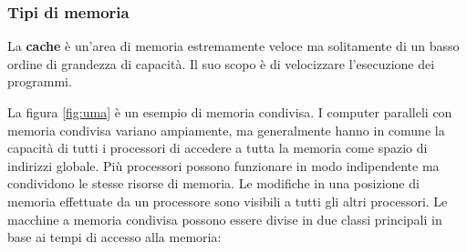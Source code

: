 \subsubsection{Tipi di memoria}
La \textbf{cache} è un'area di memoria estremamente veloce ma solitamente di un basso ordine di grandezza di capacità. Il suo scopo è di velocizzare l'esecuzione dei programmi.

La figura \ref{fig:uma} è un esempio di memoria condivisa. I computer paralleli con memoria condivisa variano ampiamente, ma generalmente hanno in comune la capacità di tutti i processori di accedere a tutta la memoria come spazio di indirizzi globale. Più processori possono funzionare in modo indipendente ma condividono le stesse risorse di memoria. Le modifiche in una posizione di memoria effettuate da un processore sono visibili a tutti gli altri processori. Le macchine a memoria condivisa possono essere divise in due classi principali in base ai tempi di accesso alla memoria:
